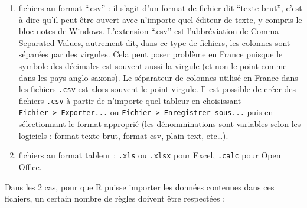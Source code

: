\documentclass[a4paperpaper,]{article}
\providecommand{\tightlist}{%
  \setlength{\itemsep}{0pt}\setlength{\parskip}{0pt}}
\theoremstyle{definition}
\theoremstyle{definition}
\theoremstyle{definition}
\theoremstyle{remark}
\begin{document}
\begin{enumerate}
\def\labelenumi{\arabic{enumi}.}
\tightlist
\item
  fichiers au format ``.csv'' : il s'agit d'un format de fichier dit
  ``texte brut'', c'est à dire qu'il peut être ouvert avec n'importe
  quel éditeur de texte, y compris le bloc notes de Windows. L'extension
  ``.csv'' est l'abbréviation de Comma Separated Values, autrement dit,
  dans ce type de fichiers, les colonnes sont séparées par des virgules.
  Cela peut poser problème en France puisque le symbole des décimales
  est souvent aussi la virgule (et non le point comme dans les pays
  anglo-saxons). Le séparateur de colonnes utilisé en France dans les
  fichiers \texttt{.csv} est alors souvent le point-virgule. Il est
  possible de créer des fichiers \texttt{.csv} à partir de n'importe
  quel tableur en choisissant
  \texttt{Fichier\ \textgreater{}\ Exporter...} ou
  \texttt{Fichier\ \textgreater{}\ Enregistrer\ sous...} puis en
  sélectionnant le format approprié (les dénomminations sont variables
  selon les logiciels : format texte brut, format csv, plain text,
  etc\ldots{}).
\item
  fichiers au format tableur : \texttt{.xls} ou \texttt{.xlsx} pour
  Excel, \texttt{.calc} pour Open Office.
\end{enumerate}

Dans les 2 cas, pour que R puisse importer les données contenues dans
ces fichiers, un certain nombre de règles doivent être respectées :
\end{document}
